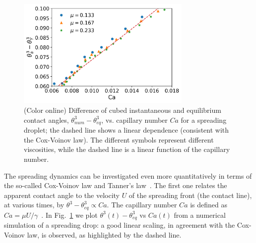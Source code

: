 \begin{figure}
    \centering %
    \includegraphics[width=0.75\textwidth]{graphics/Fig_5_Indirect_Cox_Voinov_all_data_visually_appealing_slip_2_m_nosci.png}
    \caption{(Color online) Difference of cubed instantaneous and equilibrium contact angles, $\theta_{num}^3-\theta_{eq}^3$, vs. capillary number $Ca$ for a spreading droplet; the dashed line shows a linear dependence (consistent with the Cox-Voinov law). The different symbols represent different viscosities, while the dashed line is a linear function of the capillary number.
    \label{fig:Cox-Voinov}}
\end{figure}
The spreading dynamics can be investigated even more quantitatively in terms of the 
so-called Cox-Voinov law and Tanner's law~\cite{Tanner_1979}. The first one relates the apparent contact angle to 
the velocity $U$ of the spreading front (the contact line), at various times, by 
$\theta^3 - \theta_{eq}^3 \propto Ca$. The capillary number $Ca$ is defined
as $Ca=\mu U/\gamma$~\cite{doi:10.1146/annurev-fluid-011212-140734}.
In Fig.~\ref{fig:Cox-Voinov} we plot $\theta^3(t) - \theta_{eq}^3$ vs $Ca(t)$ from a numerical simulation of a spreading drop: a good linear scaling, in agreement with the Cox-Voinov law, is 
observed, as highlighted by the dashed line. 

